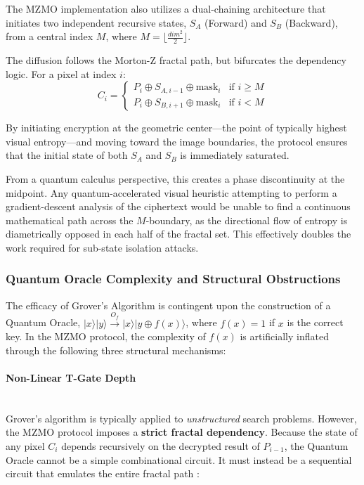\documentclass[12pt,fleqn]{article}
\begin{document}
The MZMO implementation also utilizes a dual-chaining architecture that initiates two independent recursive states, $S_A$ (Forward) and $S_B$ (Backward), from a central index $M$, where $M = \lfloor \frac{dim^2}{2} \rfloor$. 

The diffusion follows the Morton-Z fractal path, but bifurcates the dependency logic. For a pixel at index $i$:
\begin{equation}
C_i = 
\begin{cases} 
P_i \oplus S_{A, i-1} \oplus \text{mask}_i & \text{if } i \geq M \\
P_i \oplus S_{B, i+1} \oplus \text{mask}_i & \text{if } i < M 
\end{cases}
\end{equation}

By initiating encryption at the geometric center—the point of typically highest visual entropy—and moving toward the image boundaries, the protocol ensures that the initial state of both $S_A$ and $S_B$ is immediately saturated. 

From a quantum calculus perspective, this creates a phase discontinuity at the midpoint. Any quantum-accelerated visual heuristic attempting to perform a gradient-descent analysis of the ciphertext would be unable to find a continuous mathematical path across the $M$-boundary, as the directional flow of entropy is diametrically opposed in each half of the fractal set. This effectively doubles the work required for sub-state isolation attacks.

\subsubsection{Quantum Oracle Complexity and Structural Obstructions}

The efficacy of Grover’s Algorithm is contingent upon the construction of a Quantum Oracle, $|x\rangle|y\rangle \xrightarrow{O_f} |x\rangle|y \oplus f(x)\rangle$, where $f(x)=1$ if $x$ is the correct key. In the MZMO protocol, the complexity of $f(x)$ is artificially inflated through the following three structural mechanisms:

\paragraph{Non-Linear T-Gate Depth} ~\\

Grover's algorithm is typically applied to \textit{unstructured} search problems. However, the MZMO protocol imposes a \textbf{strict fractal dependency}. Because the state of any pixel $C_i$ depends recursively on the decrypted result of $P_{i-1}$, the Quantum Oracle cannot be a simple combinational circuit. It must instead be a sequential circuit that emulates the entire fractal path \cite{kaye2007introduction}:
\end{document}

